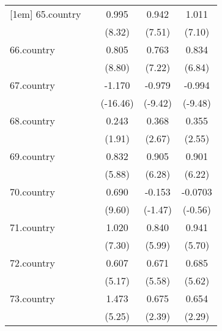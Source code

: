 {\begin{tabular}{l*{4}{c}}
[1em]
65.country  &                     &       0.995\sym{***}&       0.942\sym{***}&       1.011\sym{***}\\
            &                     &      (8.32)         &      (7.51)         &      (7.10)         \\
[1em]
66.country  &                     &       0.805\sym{***}&       0.763\sym{***}&       0.834\sym{***}\\
            &                     &      (8.80)         &      (7.22)         &      (6.84)         \\
[1em]
67.country  &                     &      -1.170\sym{***}&      -0.979\sym{***}&      -0.994\sym{***}\\
            &                     &    (-16.46)         &     (-9.42)         &     (-9.48)         \\
[1em]
68.country  &                     &       0.243         &       0.368\sym{**} &       0.355\sym{*}  \\
            &                     &      (1.91)         &      (2.67)         &      (2.55)         \\
[1em]
69.country  &                     &       0.832\sym{***}&       0.905\sym{***}&       0.901\sym{***}\\
            &                     &      (5.88)         &      (6.28)         &      (6.22)         \\
[1em]
70.country  &                     &       0.690\sym{***}&      -0.153         &     -0.0703         \\
            &                     &      (9.60)         &     (-1.47)         &     (-0.56)         \\
[1em]
71.country  &                     &       1.020\sym{***}&       0.840\sym{***}&       0.941\sym{***}\\
            &                     &      (7.30)         &      (5.99)         &      (5.70)         \\
[1em]
72.country  &                     &       0.607\sym{***}&       0.671\sym{***}&       0.685\sym{***}\\
            &                     &      (5.17)         &      (5.58)         &      (5.62)         \\
[1em]
73.country  &                     &       1.473\sym{***}&       0.675\sym{*}  &       0.654\sym{*}  \\
            &                     &      (5.25)         &      (2.39)         &      (2.29)         \\

\end{tabular}}
